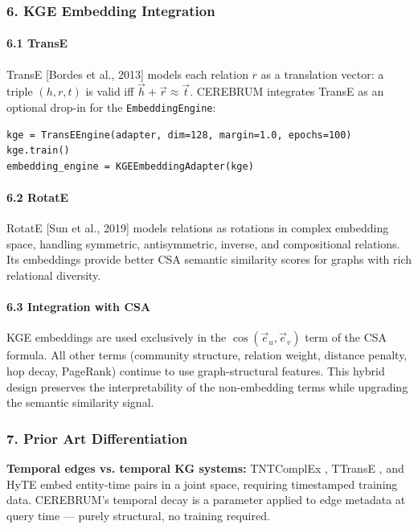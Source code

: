 \documentclass[10pt,journal,compsoc]{IEEEtran}
\begin{document}
\subsubsection{6. KGE Embedding Integration}

\paragraph{6.1 TransE}
TransE [Bordes et al., 2013] models each relation $r$ as a translation vector: a triple $(h, r, t)$ is valid iff $\vec{h} + \vec{r} \approx \vec{t}$. CEREBRUM integrates TransE as an optional drop-in for the \texttt{EmbeddingEngine}:

\begin{lstlisting}
kge = TransEEngine(adapter, dim=128, margin=1.0, epochs=100)
kge.train()
embedding_engine = KGEEmbeddingAdapter(kge)
\end{lstlisting}

\paragraph{6.2 RotatE}
RotatE [Sun et al., 2019] models relations as rotations in complex embedding space, handling symmetric, antis\-ymmetric, inverse, and compo\-sitional relations. Its embeddings provide better CSA semantic similarity scores for graphs with rich relational diversity.

\paragraph{6.3 Integration with CSA}
KGE embeddings are used exclusively in the $\cos(\vec{e}_u, \vec{e}_v)$ term of the CSA formula. All other terms (community structure, relation weight, distance penalty, hop decay, PageRank) continue to use graph-structural features. This hybrid design preserves the inter\-pretability of the non-embedding terms while upgrading the semantic similarity signal.

\subsubsection{7. Prior Art Differ\-entiation}

\textbf{Temporal edges vs. temporal KG systems:} TNTComplEx \cite{lacroix2020tntcomplex}, TTransE \cite{lin2015ttranse}, and HyTE \cite{sun2017hyte} embed entity-time pairs in a joint space, requiring timestamped training data. CEREBRUM's temporal decay is a parameter applied to edge metadata at query time — purely structural, no training required.
\end{document}
